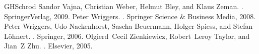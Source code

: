 \documentclass[letterpaper,10pt,german]{jupyterBook}
\begin{document}
\begin{sphinxthebibliography}{GHSchrod}
\sphinxAtStartPar
Sandor Vajna, Christian Weber, Helmut Bley, and Klaus Zeman. . Springer\sphinxhyphen{}Verlag, 2009.
\sphinxAtStartPar
Peter Wriggers. . Springer Science \& Business Media, 2008.
\sphinxAtStartPar
Peter Wriggers, Udo Nackenhorst, Sascha Beuermann, Holger Spiess, and Stefan Löhnert. . Springer, 2006.
\sphinxAtStartPar
Olgierd Cecil Zienkiewicz, Robert Leroy Taylor, and Jian Z Zhu. . Elsevier, 2005.
\end{sphinxthebibliography}







\renewcommand{\indexname}{Stichwortverzeichnis}
\printindex
\end{document}
